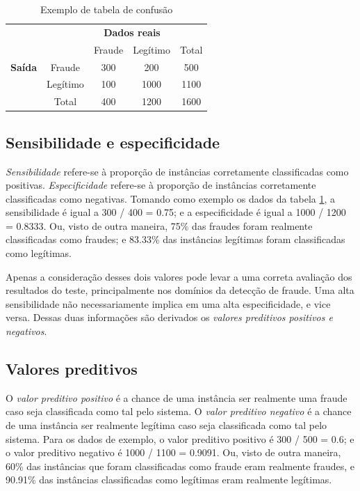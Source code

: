 \renewcommand{\arraystretch}{1.5}
\begin{table}[h!]
    \centering
    \caption{Exemplo de tabela de confusão}
    \label{fraud:ex}
    \begin{tabular}{c l c c c}
        & & \multicolumn{2}{c}{\textbf{Dados reais}} \\
        \multirow{3}{5mm}{\begin{sideways}\parbox{20mm}{\textbf{Saída}}\end{sideways}} & \multicolumn{1}{c|}{} & Fraude & Legítimo & \multicolumn{1}{|c}{Total} \\
        \cline{2-5}
        & \multicolumn{1}{c|}{Fraude}   & 300 & 200   & \multicolumn{1}{|c}{500}  \\
        & \multicolumn{1}{c|}{Legítimo} & 100 & 1000  & \multicolumn{1}{|c}{1100} \\
        \cline{2-5}
        & \multicolumn{1}{c|}{Total}    & 400 & 1200  & \multicolumn{1}{|c}{1600} \\
    \end{tabular}
\end{table}

\subsection{Sensibilidade e especificidade}

\emph{Sensibilidade} refere-se à proporção de instâncias corretamente classificadas como positivas. \emph{Especificidade} refere-se à proporção de instâncias corretamente classificadas como negativas. Tomando como exemplo os dados da tabela \ref{fraud:ex}, a sensibilidade é igual a 300 / 400 = 0.75; e a especificidade é igual a 1000 / 1200 = 0.8333. Ou, visto de outra maneira, 75\% das fraudes foram realmente classificadas como fraudes; e 83.33\% das instâncias legítimas foram classificadas como legítimas.

Apenas a consideração desses dois valores pode levar a uma correta avaliação dos resultados do teste, principalmente nos domínios da detecção de fraude. Uma alta sensibilidade não necessariamente implica em uma alta especificidade, e vice versa. Dessas duas informações são derivados os \emph{valores preditivos positivos e negativos}.

\subsection{Valores preditivos}

O \emph{valor preditivo positivo} é a chance de uma instância ser realmente uma fraude caso seja classificada como tal pelo sistema. O \emph{valor preditivo negativo} é a chance de uma instância ser realmente legítima caso seja classificada como tal pelo sistema. Para os dados de exemplo, o valor preditivo positivo é 300 / 500 = 0.6; e o valor preditivo negativo é 1000 / 1100 = 0.9091. Ou, visto de outra maneira, 60\% das instâncias que foram classificadas como fraude eram realmente fraudes, e 90.91\% das instâncias classificadas como legítimas eram realmente legítimas.

